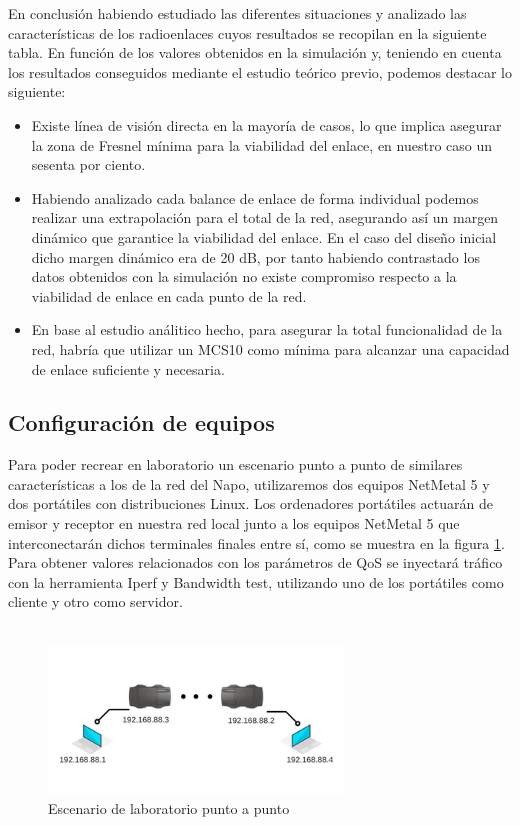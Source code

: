 	En conclusión habiendo estudiado las diferentes situaciones y analizado las características de los radioenlaces cuyos resultados se recopilan en la siguiente tabla. En función de los valores obtenidos en la simulación y, teniendo en cuenta los resultados conseguidos mediante el estudio teórico previo, podemos destacar lo siguiente: 
	\begin{itemize}
		\item Existe línea de visión directa en la mayoría de casos, lo que implica asegurar la zona de Fresnel mínima para la viabilidad del enlace, en nuestro caso un sesenta por ciento.
		\item Habiendo analizado cada balance de enlace de forma individual podemos realizar una extrapolación para el total de la red, asegurando así un margen dinámico que garantice la viabilidad del enlace. En el caso del diseño inicial dicho margen dinámico era de 20 dB, por tanto habiendo contrastado los datos obtenidos con la simulación no existe compromiso respecto a la viabilidad de enlace en cada punto de la red.
		\item En base al estudio análitico hecho, para asegurar la total funcionalidad de la red, habría que utilizar un MCS10 como mínima para alcanzar una capacidad de enlace suficiente y necesaria.
	\end{itemize}
	
\subsection{Configuración de equipos}
Para poder recrear en laboratorio un escenario punto a punto de similares características a los de la red del Napo, utilizaremos dos equipos NetMetal 5 y dos portátiles con distribuciones Linux. Los ordenadores portátiles actuarán de emisor y receptor en nuestra red local junto a los equipos NetMetal 5 que interconectarán dichos terminales finales entre sí, como se muestra en la figura \ref{enlace}. Para obtener valores relacionados con los parámetros de QoS se inyectará tráfico con la herramienta Iperf y Bandwidth test, utilizando uno de los portátiles como cliente y otro como servidor.\\\\

\begin{figure}[H]
	\centering
	\includegraphics[width=0.7\textwidth]{img/escenario.png}
	\caption{Escenario de laboratorio punto a punto}
	\label{enlace}
\end{figure}

